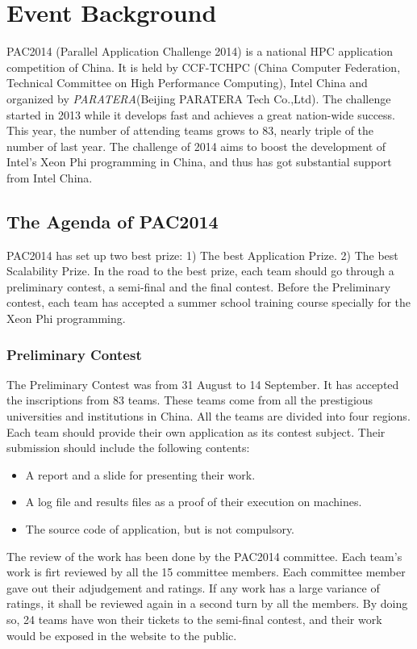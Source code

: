 \chapter{Event Background}
\label{chp:1}

PAC2014 (Parallel Application Challenge 2014) is a national HPC application competition of China. It is held by CCF-TCHPC (China Computer Federation,
Technical Committee on High Performance Computing), Intel China and organized by \textsl{PARATERA}(Beijing PARATERA Tech Co.,Ltd). The challenge 
started in 2013 while it develops fast and achieves a great nation-wide success. This year, the number of attending teams grows to 83, nearly triple of
the number of last year. The challenge of 2014 aims to boost the development of Intel's Xeon Phi programming in China, and thus has got substantial 
support from Intel China. 

\section{The Agenda of PAC2014} %
\label{sec:AgendaPAC2014}

PAC2014 has set up two best prize: 1) The best Application Prize. 2) The best Scalability Prize.
In the road to the best prize, each team should go through a preliminary contest, a semi-final and the final contest. 
Before the Preliminary contest, each team has accepted a summer school training course specially for the Xeon Phi programming.  

\subsection{Preliminary Contest} %
\label{sub:Preliminary}
The Preliminary Contest was from 31 August to 14 September. It has accepted the inscriptions from 83 teams. 
These teams come from all the prestigious universities and institutions in China. All the teams are divided into four regions.  
Each team should provide their own application as its contest subject. Their submission should include the following contents: 
\begin{itemize}
	\item A report and a slide for presenting their work.
	\item A log file and results files as a proof of their execution on machines.
	\item The source code of application, but is not compulsory.
\end{itemize}
The review of the work has been done by the PAC2014 committee. Each team's work is firt reviewed by all the 15 committee members. Each committee member
gave out their adjudgement and ratings. If any work has a large variance of ratings, it shall be reviewed again in a second turn by all the members. 
By doing so, 24 teams have won their tickets to the semi-final contest, and their work would be exposed in the website to the public. 

